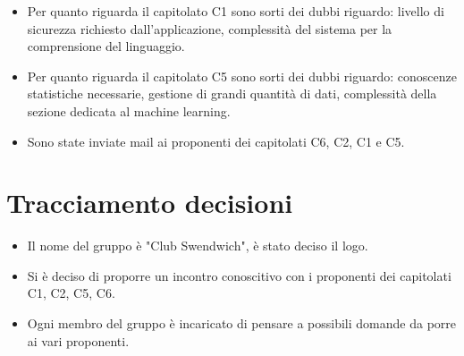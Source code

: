\begin{itemize}
    \item Per quanto riguarda il capitolato C1 sono sorti dei dubbi riguardo: livello di sicurezza richiesto dall'applicazione, complessità del sistema per la comprensione del linguaggio.
    \item Per quanto riguarda il capitolato C5 sono sorti dei dubbi riguardo: conoscenze statistiche necessarie, gestione di grandi quantità di dati, complessità della sezione dedicata al machine learning.
    \item Sono state inviate mail ai proponenti dei capitolati C6, C2, C1 e C5.
\end{itemize}
\section{Tracciamento decisioni}
\begin{itemize}
    \item Il nome del gruppo è "Club Swendwich", è stato deciso il logo.
    \item Si è deciso di proporre un incontro conoscitivo con i proponenti dei capitolati C1, C2, C5, C6.
    \item Ogni membro del gruppo è incaricato di pensare a possibili domande da porre ai vari proponenti.
\end{itemize}